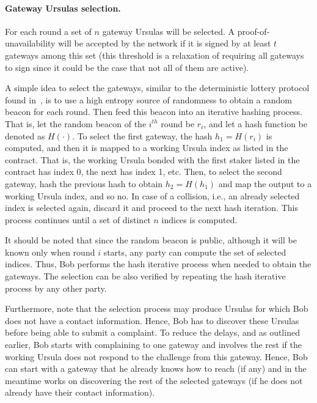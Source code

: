 \paragraph{\bf Gateway Ursulas selection.} 
For each round a set of $n$ gateway Ursulas will be selected. A proof-of-unavailability will be accepted by the network if it is signed by at least $t$ gateways among this set (this threshold is a relaxation of requiring all gateways to sign since it could be the case that not all of them are active). 


A simple idea to select the gateways, similar to the deterministic lottery protocol found in~\cite{almashaqbeh2020microcash}, is to use a high entropy source of randomness to obtain a random beacon for each round. Then feed this beacon into an iterative hashing process. That is, let the random beacon of the $i^{th}$ round be $r_i$, and let a hash function be denoted as $H(\cdot)$. To select the first gateway, the hash $h_1 = H(r_i)$ is computed, and then it is mapped to a working Ursula index as listed in the \stakeescrow contract. That is, the working Ursula bonded with the first staker listed in the contract has index 0, the next has index 1, etc. Then, to select the second gateway, hash the previous hash to obtain $h_2 = H(h_1)$ and map the output to a working Ursula index, and so no. In case of a collision, i.e., an already selected index is selected again, discard it and proceed to the next hash iteration. This process continues until a set of distinct $n$ indices is computed. 


It should be noted that since the random beacon is public, although it will be known only when round $i$ starts, any party can compute the set of selected indices. Thus, Bob performs the hash iterative process when needed to obtain the gateways. The selection can be also verified by repeating the hash iterative process by any other party.


Furthermore, note that the selection process may produce Ursulas for which Bob does not have a contact information. Hence, Bob has to discover these Ursulas before being able to submit a complaint. To reduce the delays, and as outlined earlier, Bob starts with complaining to one gateway and involves the rest if the working Ursula does not respond to the challenge from this gateway. Hence, Bob can start with a gateway that he already knows how to reach (if any) and in the meantime works on discovering the rest of the selected gateways (if he does not already have their contact information).



